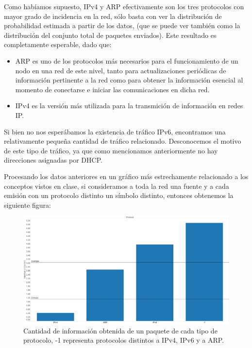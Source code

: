 \documentclass{article}
\theoremstyle{definition}
\theoremstyle{remark}
\begin{document}
Como habíamos supuesto, IPv4 y 
ARP efectivamente son los tres protocolos con mayor grado de incidencia en la red, sólo basta con ver la distribución de probabilidad estimada a partir de los datos, (que se puede ver también como la distribución del conjunto total de paquetes enviados). Este resultado es completamente esperable, dado que:

\begin{itemize}
\item ARP es uno de los protocolos más necesarios para el funcionamiento de un nodo en una red de este nivel, tanto para actualizaciones periódicas de información pertinente a la red como para obtener la información esencial al momento de conectarse e iniciar las comunicaciones en dicha red.

\item IPv4 es la versión más utilizada para la transmición de información en redes IP.
\end{itemize}

Si bien no nos esperábamos la existencia de tráfico IPv6, encontramos una relativamente pequeña cantidad de tráfico relacionado. Desconocemos el motivo de este tipo de tráfico, ya que como mencionamos anteriormente no hay direcciones asignadas por DHCP.

Procesando los datos anteriores en un gráfico más estrechamente relacionado a los conceptos vistos en clase, si consideramos a toda la red una fuente y a cada emisión con un protocolo distinto un símbolo distinto, entonces obtenemos la siguiente figura:

\begin{figure}[H]
\centering
\includegraphics[width=450pt]{captures/LabosDC/Protocol PDF Dashboard.png}
\caption{Cantidad de información obtenida de un paquete de cada tipo de protocolo, -1 representa protocolos distintos a IPv4, IPv6 y a ARP.}
\end{figure}
\end{document}
